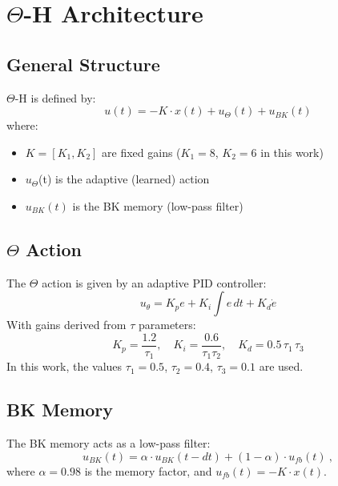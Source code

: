\documentclass[twocolumn]{article}
\begin{document}
\section{$\Theta$-H Architecture}
\label{sec:theta_h}

\subsection{General Structure}

$\Theta$-H is defined by:
\begin{equation}
u(t) = -K \cdot x(t) + u_\Theta(t) + u_{BK}(t)
\label{eq:theta_h}
\end{equation}
where:
\begin{itemize}
    \item $K = [K_1, K_2]$ are fixed gains ($K_1=8$, $K_2=6$ in this work)
    \item $u_\Theta$(t) is the adaptive (learned) action
    \item $u_{BK}(t)$ is the BK memory (low-pass filter)
\end{itemize}

\subsection{$\Theta$ Action}

The $\Theta$ action is given by an adaptive PID controller:
\begin{equation}
u_\theta = K_p e + K_i \int e \, dt + K_d \dot{e}
\label{eq:theta_action}
\end{equation}
With gains derived from $\tau$ parameters:
\begin{equation}
K_p = \frac{1.2}{\tau_1}, \quad 
K_i = \frac{0.6}{\tau_1 \tau_2}, \quad 
K_d = 0.5\, \tau_1\, \tau_3
\label{eq:gains}
\end{equation}
In this work, the values $\tau_1 = 0.5$, $\tau_2 = 0.4$, $\tau_3 = 0.1$ are used.

\subsection{BK Memory}

The BK memory acts as a low-pass filter:
\begin{equation}
u_{BK}(t) = \alpha \cdot u_{BK}(t-dt) + (1-\alpha) \cdot u_{fb}(t)~,
\label{eq:bk}
\end{equation}
where $\alpha = 0.98$ is the memory factor, and $u_{fb}(t) = -K \cdot x(t)$.
\end{document}
